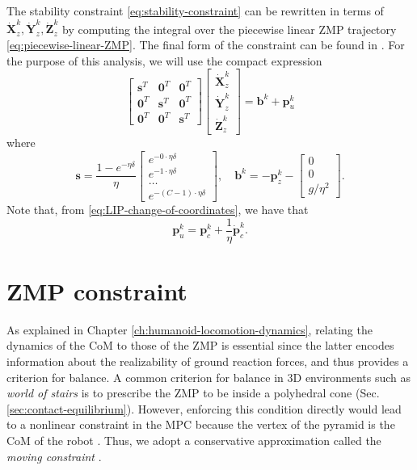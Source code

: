 The stability constraint \eqref{eq:stability-constraint} can be rewritten in 
terms of $\dot{\bm{X}}_z^k, \dot{\bm{Y}}_z^k, \dot{\bm{Z}}_z^k$ by computing
the integral over the piecewise linear ZMP trajectory \eqref{eq:piecewise-linear-ZMP}.
The final form of the constraint can be found in \cite{Scianca2020TRO}.
For the purpose of this analysis, we will use the compact expression
\begin{equation*}
    \label{eq:stability-constraint-matrix}
    \begin{bmatrix}
        \bm{s}^T & \bm{0}^T & \bm{0}^T \\
        \bm{0}^T & \bm{s}^T & \bm{0}^T \\
        \bm{0}^T & \bm{0}^T & \bm{s}^T
    \end{bmatrix}
    \begin{bmatrix}
        \dot{\bm{X}}_z^k \\ \dot{\bm{Y}}_z^k \\ \dot{\bm{Z}}_z^k
    \end{bmatrix}
    =
    \bm{b}^k + \bm{p}_u^k
\end{equation*}
where
\begin{equation}
    \bm{s} =
    \frac{1-e^{-\eta\delta}}{\eta}
    \begin{bmatrix}
        e^{-0\cdot\eta\delta} \\
        e^{-1\cdot\eta\delta} \\
        \dots \\
        e^{-(C-1)\cdot\eta\delta}
    \end{bmatrix}, \quad
    \bm{b}^k = -\bm{p}_z^k -
    \begin{bmatrix}
        0 \\ 0 \\ g / \eta^2
    \end{bmatrix}.
\end{equation}
Note that, from \ref{eq:LIP-change-of-coordinates}, we have that
\begin{equation}
    \bm{p}_u^k = \bm{p}_c^k + \frac{1}{\eta} \dot{\bm{p}}_c^k.
\end{equation}

\section{ZMP constraint}
As explained in Chapter \ref{ch:humanoid-locomotion-dynamics},
relating the dynamics of the CoM to those of the ZMP is essential since the
latter encodes information about the realizability of ground reaction forces,
and thus provides a criterion for balance. A common criterion for balance
in 3D environments such as \textit{world of stairs}
is to prescribe the ZMP to be inside a polyhedral cone
(Sec. \ref{sec:contact-equilibrium}). However, enforcing this condition
directly would lead to a nonlinear constraint
in the MPC because the vertex of the pyramid is the CoM of the robot
\cite{Caron2017DynamicWalkingOverRoughTerrains}.
Thus, we adopt a conservative approximation called the \textit{moving constraint}
\cite{Aboudonia2017Humanoids}.

